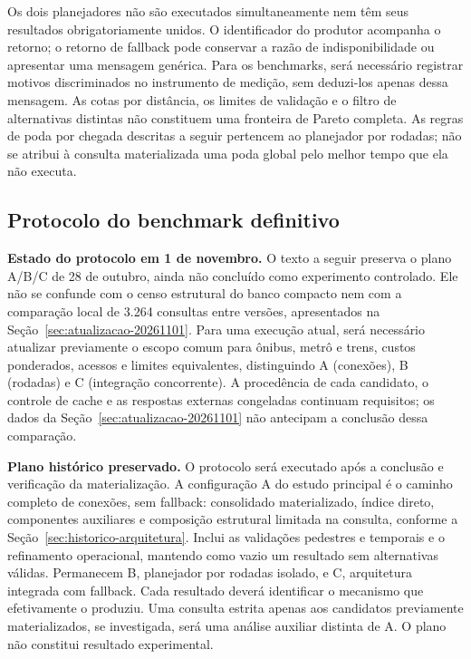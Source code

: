 Os dois planejadores não são executados simultaneamente nem têm seus resultados obrigatoriamente unidos. O identificador do produtor acompanha o retorno; o retorno de fallback pode conservar a razão de indisponibilidade ou apresentar uma mensagem genérica. Para os benchmarks, será necessário registrar motivos discriminados no instrumento de medição, sem deduzi-los apenas dessa mensagem. As cotas por distância, os limites de validação e o filtro de alternativas distintas não constituem uma fronteira de Pareto completa. As regras de poda por chegada descritas a seguir pertencem ao planejador por rodadas; não se atribui à consulta materializada uma poda global pelo melhor tempo que ela não executa.

\subsection{Protocolo do benchmark definitivo}\label{sec:benchmark-hibrido}
\textbf{Estado do protocolo em 1 de novembro.} O texto a seguir preserva o plano A/B/C de 28 de outubro, ainda não concluído como experimento controlado. Ele não se confunde com o censo estrutural do banco compacto nem com a comparação local de 3.264 consultas entre versões, apresentados na Seção~\ref{sec:atualizacao-20261101}. Para uma execução atual, será necessário atualizar previamente o escopo comum para ônibus, metrô e trens, custos ponderados, acessos e limites equivalentes, distinguindo A (conexões), B (rodadas) e C (integração concorrente). A procedência de cada candidato, o controle de cache e as respostas externas congeladas continuam requisitos; os dados da Seção~\ref{sec:atualizacao-20261101} não antecipam a conclusão dessa comparação.

\textbf{Plano histórico preservado.} O protocolo será executado após a conclusão e verificação da materialização. A configuração A do estudo principal é o caminho completo de conexões, sem fallback: consolidado materializado, índice direto, componentes auxiliares e composição estrutural limitada na consulta, conforme a Seção~\ref{sec:historico-arquitetura}. Inclui as validações pedestres e temporais e o refinamento operacional, mantendo como vazio um resultado sem alternativas válidas. Permanecem B, planejador por rodadas isolado, e C, arquitetura integrada com fallback. Cada resultado deverá identificar o mecanismo que efetivamente o produziu. Uma consulta estrita apenas aos candidatos previamente materializados, se investigada, será uma análise auxiliar distinta de A. O plano não constitui resultado experimental.

